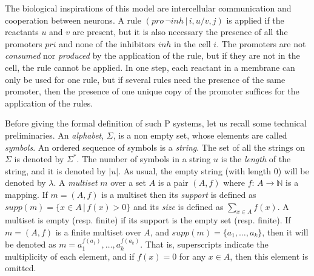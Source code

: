 \documentclass[journal]{IEEEtran}
\begin{document}
The biological inspirations of this model are intercellular
communication and cooperation between neurons. A rule $(pro\,\neg
inh\,|\,i,u/v,j)$ is applied if the reactants $u$ and $v$ are
present, but it is also necessary the presence of all the promoters
$pri$ and none of the inhibitors $inh$ in the cell $i$. The
promoters are not \emph{consumed} nor \emph{produced} by the
application of the rule, but if they are not in the cell, the rule
cannot be applied. In one step, each reactant in a membrane can only
be used for one rule, but if several rules need the presence of the
same promoter, then the presence of one unique copy of the promoter
suffices for the application of the rules.

Before giving the formal definition of such P systems, let us recall
some technical preliminaries. An \emph{alphabet}, $\Sigma$, is a non
empty set, whose elements are called \emph{symbols}. An ordered
sequence of symbols is a \emph{string}. The set of all the strings
on $\Sigma$ is denoted by $\Sigma^*$. The number of symbols in a
string $u$ is the \emph{length} of the string, and it is denoted by
$|u|$. As usual, the empty string (with length 0) will be denoted by
$\lambda$. A {\em multiset} $m$ over a set $A$ is a pair $(A,f)$
where $f:\,A\to {\mathbb N}$ is a mapping. If $m=(A,f)$ is a
multiset then its {\em support} is defined as $supp(m)=\{x\in A
\,|\,f(x)> 0\}$ and its \emph{size} is defined as $\sum_{x\in
A}f(x)$. A multiset is empty (resp. finite) if its support is the
empty set (resp. finite). If $m=(A,f)$ is a finite multiset over
$A$, and $supp(m)=\{ a_1,\ldots,a_k\}$, then it will be denoted as
$m=a_1^{f(a_1)},\dots,a_k^{f(a_k)}$. That is, superscripts indicate
the multiplicity of each element, and if $f(x)=0$ for any $x\in A$,
then this element is omitted.
\end{document}
